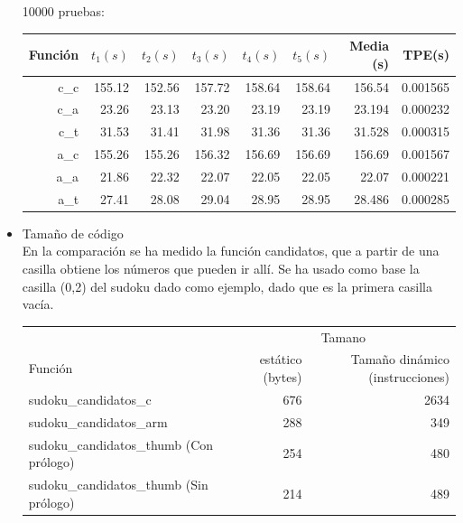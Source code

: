 \documentclass[12pt,letterpaper]{article}
\begin{document}
\begin{itemize}
  10000 pruebas:\\
  \begin{center}
    \begin{tabular}{ r | r | r | r | r | r | r | r }
      Funci\'on & $t_1 (s)$ & $t_2 (s)$ & $t_3 (s)$ & $t_4 (s)$ & $t_5 (s)$ & Media (s) & TPE\footnotemark[1] (s) \\ \hline
      c\_c    & 155.12 & 152.56 & 157.72 & 158.64 & 158.64 & 156.54 & 0.001565 \\
      c\_a    & 23.26  & 23.13  & 23.20  & 23.19  & 23.19  & 23.194 & 0.000232 \\
      c\_t    & 31.53  & 31.41  & 31.98  & 31.36  & 31.36  & 31.528 & 0.000315 \\ \hline
      a\_c    & 155.26 & 155.26 & 156.32 & 156.69 & 156.69 & 156.69 & 0.001567 \\
      a\_a    & 21.86  & 22.32  & 22.07  & 22.05  & 22.05  & 22.07  & 0.000221 \\
      a\_t    & 27.41  & 28.08  & 29.04  & 28.95  & 28.95  & 28.486 & 0.000285 \\ \hline
    \end{tabular}
  \end{center}
  \clearpage
\item {\large Tamaño de c\'odigo}\\
  En la comparaci\'on se ha medido la funci\'on candidatos, que a partir
  de una casilla obtiene los n\'umeros que pueden ir all\'i. Se ha usado
  como base la casilla (0,2) del sudoku dado como ejemplo, dado que es
  la primera casilla vac\'ia.
  \begin{center}
    \begin{tabular}{ l | r | r }
      & \multicolumn{2}{|c|}{Tamano} \\
      Funci\'on                                 & est\'atico (bytes)   & Tamaño din\'amico (instrucciones) \\ \hline
      sudoku\_candidatos\_c                   & 676                       & 2634                            \\
      sudoku\_candidatos\_arm                 & 288                       & 349                             \\
      sudoku\_candidatos\_thumb (Con pr\'ologo) & 254                       & 480                             \\
      sudoku\_candidatos\_thumb (Sin pr\'ologo) & 214                       & 489                             \\ \hline

\end{tabular}
\end{center}
\end{itemize}
\end{document}
